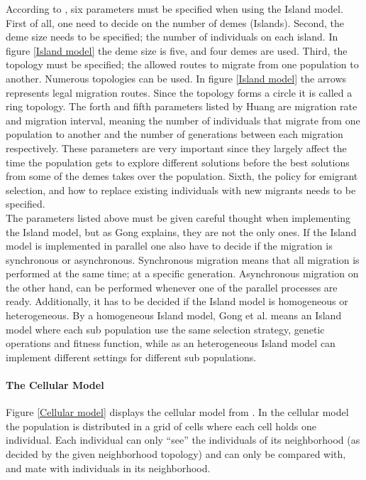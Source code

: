 \noindent According to \cite{Huang}, six parameters must be specified when using the Island model. First of all, one need to decide on the number of demes (Islands). Second, the deme size needs to be specified; the number of individuals on each island. In figure \ref{Island model} the deme size is five, and four demes are used. Third, the topology must be specified; the allowed routes to migrate from one population to another. Numerous topologies can be used. In figure \ref{Island model} the arrows represents legal migration routes. Since the topology forms a circle it is called a ring topology. The forth and fifth parameters listed by Huang are migration rate and migration interval, meaning the number of individuals that migrate from one population to another and the number of generations between each migration respectively. These parameters are very important since they largely affect the time the population gets to explore different solutions before the best solutions from some of the demes takes over the population. Sixth, the policy for emigrant selection, and how to replace existing individuals with new migrants needs to be specified. \\


\noindent The parameters listed above must be given careful thought when implementing the Island model, but as Gong explains, they are not the only ones. If the Island model is implemented in parallel one also have to decide if the migration is synchronous or asynchronous. Synchronous migration means that all migration is performed at the same time; at a specific generation. Asynchronous migration on the other hand, can be performed whenever one of the parallel processes are ready. Additionally, it has to be decided if the Island model is homogeneous or heterogeneous. By a homogeneous Island model, Gong et al. means an Island model where each sub population use the same selection strategy, genetic operations and fitness function, while as an heterogeneous Island model can implement different settings for different sub populations.


\paragraph*{The Cellular Model}
Figure \ref{Cellular model} displays the cellular model from \cite{Gong}. In the cellular model the population is distributed in a grid of cells where each cell holds one individual. Each individual can only ``see'' the individuals of its neighborhood (as decided by the given neighborhood topology) and can only be compared with, and mate with individuals in its neighborhood. \\



